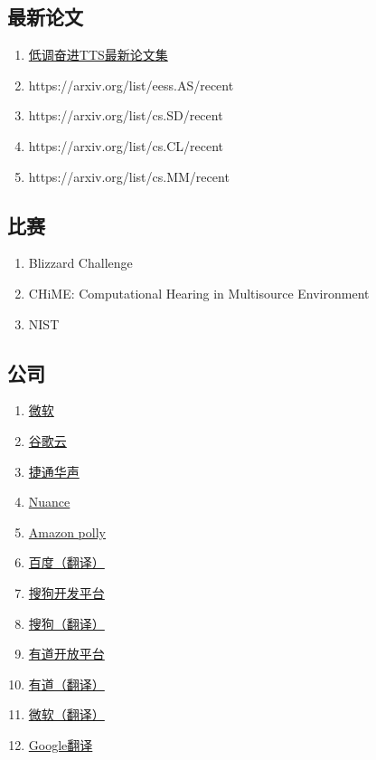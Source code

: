 \documentclass[cn,10pt,math=newtx,citestyle=gb7714-2015,bibstyle=gb7714-2015]{elegantbook}
\begin{document}
\subsection{最新论文}
\begin{enumerate}
  \item \href{http://yqli.tech/page/tts_paper.html}{低调奋进TTS最新论文集}
  \item https://arxiv.org/list/eess.AS/recent
  \item https://arxiv.org/list/cs.SD/recent
  \item https://arxiv.org/list/cs.CL/recent
  \item https://arxiv.org/list/cs.MM/recent
\end{enumerate}

\subsection{比赛}
\begin{enumerate}
  \item Blizzard Challenge
  \item CHiME: Computational Hearing in Multisource Environment
  \item NIST
\end{enumerate}

\subsection{公司}
\begin{enumerate}
  \item \href{https://azure.microsoft.com/en-us/services/cognitive-services/text-to-speech/#features}{微软}
  \item \href{https://cloud.google.com/text-to-speech/docs/voices?hl=zh-cn}{谷歌云}
  \item \href{https://www.aicloud.com/dev/ability/index.html?key=tts#ability-experience}{捷通华声}
  \item \href{https://www.nuance.com/omni-channel-customer-engagement/voice-and-ivr/text-to-speech.html#!}{Nuance}
  \item \href{https://aws.amazon.com/cn/polly/}{Amazon polly}
  \item \href{https://fanyi.baidu.com/}{百度（翻译）}
  \item \href{https://ai.sogou.com/product/audio_composition/}{搜狗开发平台}
  \item \href{https://fanyi.sogou.com/}{搜狗（翻译）}
  \item \href{https://ai.youdao.com/product-tts.s}{有道开放平台}
  \item \href{http://fanyi.youdao.com}{有道（翻译）}
  \item \href{https://cn.bing.com/translator}{微软（翻译）}
  \item \href{https://translate.google.cn/}{Google翻译}
\end{enumerate}
\end{document}
